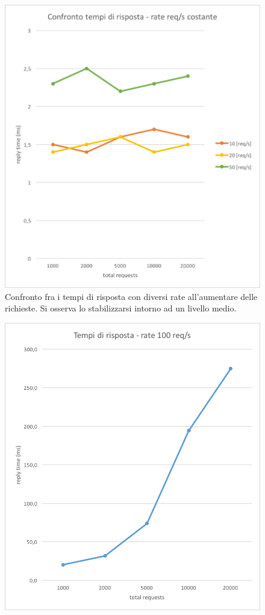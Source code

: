 \documentclass[italian]{tktltiki2}
\begin{document}
\begin{figure}[H]
\centering
\includegraphics[width=\textwidth]{images/cfr_reply_time1}
\caption{Confronto fra i tempi di risposta con diversi rate all'aumentare delle richieste. Si osserva lo stabilizzarsi intorno ad un livello medio.\label{fig: cfr_reply_time1}}
\end{figure}\begin{figure}[H]
\centering
\includegraphics[width=\textwidth]{images/cfr_reply_time2}

\end{figure}
\end{document}
